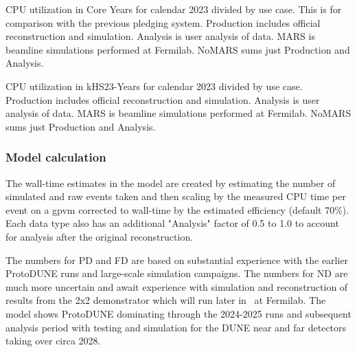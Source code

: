 \documentclass[12pt]{article}
\begin{document}

\begin{table}[h]
\centering{}
\caption{CPU utilization in Core Years  for calendar 2023 divided by use case.  This is for comparison with the previous pledging system.    Production includes  official reconstruction and simulation. Analysis is user analysis of data.  MARS is beamline simulations performed at Fermilab.  NoMARS sums just Production and Analysis.  }
\label{tab:CPUCores}
\end{table}

\begin{table}[h]
\centering{}
\caption{CPU utilization in kHS23-Years for calendar 2023 divided by use case.   Production includes official reconstruction and simulation. Analysis is user analysis of data.  MARS is beamline simulations performed at Fermilab.  NoMARS sums just Production and Analysis. }
\label{tab:CPUusage}
\end{table}


\subsubsection{Model calculation}
The wall-time estimates in the model are created by estimating the number of simulated and raw events taken and then scaling by the measured CPU time per event on a gpvm corrected to wall-time by the estimated efficiency (default 70\%).  Each data type also has an additional "Analysis" factor of 0.5 to 1.0  to account for analysis after the original reconstruction.  

The numbers for PD and FD are based on substantial experience with the earlier ProtoDUNE runs and  large-scale simulation campaigns.  The numbers for ND are much more uncertain and await experience with  simulation and reconstruction of results from the 2x2 demonstrator which will run later in \ThisYear\ at Fermilab. The model shows ProtoDUNE dominating through the 2024-2025 runs and subsequent analysis period with  testing and simulation for the DUNE near and far detectors taking over circa 2028. 
\end{document}
